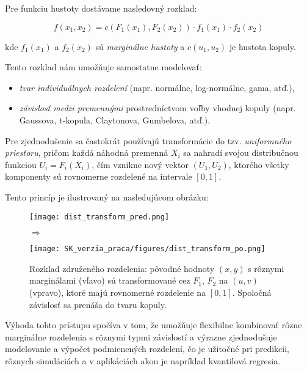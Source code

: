 Pre funkciu hustoty dostávame nasledovný rozklad:

\begin{equation}\label{eq:copula_density}
f(x_1, x_2) = c\left(F_1(x_1), F_2(x_2)\right) \cdot f_1(x_1) \cdot f_2(x_2)
\end{equation}

kde $f_1(x_1)$ a $f_2(x_2)$ sú \textit{marginálne hustoty} a $c(u_1, u_2)$ je hustota kopuly.

Tento rozklad nám umožňuje samostatne modelovať:
\begin{itemize}
  \item \textit{tvar individuálnych rozdelení} (napr. normálne, log-normálne, gama, atď.),
  \item \textit{závislosť medzi premennými} prostredníctvom voľby vhodnej kopuly (napr. Gaussova, t-kopula, Claytonova, Gumbelova, atď.).
\end{itemize}

Pre zjednodušenie sa častokrát používajú transformácie do tzv. \textit{uniformného priestoru}, pričom každá náhodná premenná $X_i$ sa nahradí svojou distribučnou funkciou $U_i = F_i(X_i)$, čím vznikne nový vektor $(U_1, U_2)$, ktorého všetky komponenty sú rovnomerne rozdelené na intervale $[0,1]$.

Tento princíp je ilustrovaný na nasledujúcom obrázku:

\begin{figure}[H]
    \centering
    \begin{minipage}{0.45\linewidth}
        \centering
        \texttt{[image: dist\_transform\_pred.png]}
    \end{minipage}
    \begin{minipage}{0.05\linewidth}
        \centering
        \Huge$\Rightarrow$
    \end{minipage}
    \begin{minipage}{0.45\linewidth}
        \centering
        \texttt{[image: SK\_verzia\_praca/figures/dist\_transform\_po.png]}
    \end{minipage}
    \caption{Rozklad združeného rozdelenia: pôvodné hodnoty $(x, y)$ s rôznymi marginálami (vľavo) sú transformované cez $F_1$, $F_2$ na $(u,v)$ (vpravo), ktoré majú rovnomerné rozdelenie na $[0,1]$. Spoločná závislosť sa prenáša do tvaru kopuly.}
    \label{fig:sklar_transform}
\end{figure}

Výhoda tohto prístupu spočíva v tom, že umožňuje flexibilne kombinovať rôzne marginálne rozdelenia s rôznymi typmi závislostí a výrazne zjednodušuje modelovanie a výpočet podmienených rozdelení, čo je užitočné pri predikcii, rôznych simuláciách a v aplikáciách akou je napríklad kvantilová regresia.

